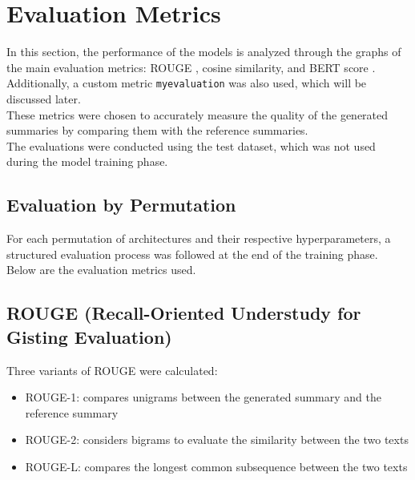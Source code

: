 \section{Evaluation Metrics}
In this section, the performance of the models is analyzed through the graphs of the main evaluation metrics: ROUGE \cite{lin-2004-rouge}, cosine similarity, and BERT score \cite{zhang2020bertscoreevaluatingtextgeneration}.\\
Additionally, a custom metric \texttt{myevaluation} was also used, which will be discussed later.\\
These metrics were chosen to accurately measure the quality of the generated summaries by comparing them with the reference summaries.\\
The evaluations were conducted using the test dataset, which was not used during the model training phase.\\

\subsection{Evaluation by Permutation}
For each permutation of architectures and their respective hyperparameters,
a structured evaluation process was followed at the end of the
training phase. Below are the evaluation metrics used.

\subsection{ROUGE (Recall-Oriented Understudy for Gisting Evaluation)}
Three variants of ROUGE were calculated:
\begin{itemize}
    \item ROUGE-1: compares unigrams between the generated summary and the reference summary
    \item ROUGE-2: considers bigrams to evaluate the similarity between the two texts
    \item ROUGE-L: compares the longest common subsequence between the two texts
\end{itemize}

